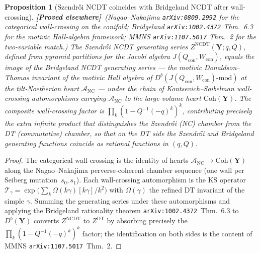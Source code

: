 \documentclass[11pt]{amsart}
\newtheorem{proposition}[theorem]{Proposition}
\theoremstyle{definition}
\providecommand{\bY}{\mathbf{Y}}
\providecommand{\cA}{\mathcal{A}}
\providecommand{\ClaimStatusProvedElsewhere}{\textbf{\textsf{[Proved elsewhere]}}}
\begin{document}
\begin{proposition}[Szendrői NCDT coincides with Bridgeland NCDT after
wall-crossing]
\label{prop:szendroi-bridgeland-coincidence}
\ClaimStatusProvedElsewhere\ \emph{(Nagao--Nakajima
\texttt{arXiv:0809.2992} for the categorical wall-crossing on the
conifold; Bridgeland \texttt{arXiv:1002.4372} Thm.~6.3 for the motivic
Hall-algebra framework; MMNS \texttt{arXiv:1107.5017} Thm.~2 for the
two-variable match.)}
The Szendrői NCDT generating series $Z^{\mathrm{NCDT}}(\bY;q,Q)$, defined
from pyramid partitions for the Jacobi algebra $J(Q_{\mathrm{con}},
W_{\mathrm{con}})$, equals the image of the Bridgeland NCDT generating
series — the motivic Donaldson--Thomas invariant of the motivic Hall
algebra of $D^b(J(Q_{\mathrm{con}}, W_{\mathrm{con}})\text{-mod})$ at
the tilt-Noetherian heart $\cA_{\mathrm{NC}}$ — under the chain of
Kontsevich--Soibelman wall-crossing automorphisms carrying
$\cA_{\mathrm{NC}}$ to the large-volume heart $\mathrm{Coh}(\bY)$. The
composite wall-crossing factor is $\prod_k (1 - Q^{-1}(-q)^k)^{k}$,
contributing precisely the extra infinite product that distinguishes
the Szendrői (NC) chamber from the DT (commutative) chamber, so that
on the DT side the Szendrői and Bridgeland generating functions
coincide as rational functions in $(q, Q)$.
\end{proposition}
\begin{proof}
The categorical wall-crossing is the identity of hearts
$\cA_{\mathrm{NC}} \to \mathrm{Coh}(\bY)$ along the Nagao--Nakajima
perverse-coherent chamber sequence (one wall per Seiberg
mutation~$s_0, s_1$). Each wall-crossing automorphism is the KS
operator $\mathcal T_\gamma = \exp\bigl(\sum_k \Omega(k\gamma)
[k\gamma]/k^2\bigr)$ with $\Omega(\gamma)$ the refined DT invariant
of the simple $\gamma$. Summing the generating series under these
automorphisms and applying the Bridgeland rationality theorem
\texttt{arXiv:1002.4372}~Thm.~6.3 to $D^b(\bY)$ converts
$Z^{\mathrm{NCDT}}$ to $Z^{\mathrm{DT}}$ by absorbing precisely the
$\prod_k (1 - Q^{-1}(-q)^k)^k$ factor; the identification on both
sides is the content of MMNS \texttt{arXiv:1107.5017}~Thm.~2.
\end{proof}
\end{document}
